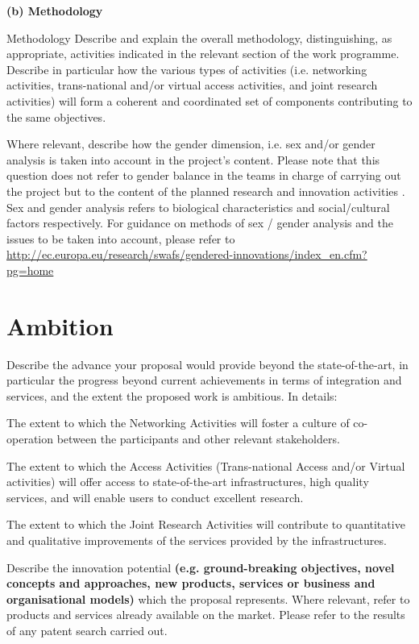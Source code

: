 

{\bf (b) Methodology}

\begin{todo}{Methodology}\color{red}
  Describe and explain the overall methodology, distinguishing, as appropriate, activities indicated in the relevant section of the work programme. Describe in particular how the various types of activities (i.e. networking activities, trans-national and/or virtual access activities, and joint research activities) will form a coherent and coordinated set of components contributing to the same objectives.

  Where relevant, describe how the gender dimension, i.e. sex and/or gender analysis is taken into account in the project’s content.
  Please note that this question does not refer to gender balance in the teams in charge of carrying out the project but to the content of the planned research and innovation activities . Sex and gender analysis refers to biological characteristics and social/cultural factors respectively. For guidance on methods of sex / gender analysis and the issues to be taken into account, please refer to \url{http://ec.europa.eu/research/swafs/gendered-innovations/index_en.cfm?pg=home} 
\end{todo}



\section{Ambition}

\begin{todo}{}\color{red}
  Describe the advance your proposal would provide beyond the state-of-the-art, in particular the progress beyond current achievements in terms of integration and services, and the extent the proposed work is ambitious. In details:

  The extent to which the Networking Activities will foster a culture of co-operation between the participants and other relevant stakeholders.

  The extent to which the Access Activities (Trans-national Access and/or Virtual activities) will offer access to state-of-the-art infrastructures, high quality services, and will enable users to conduct excellent research.

  The extent to which the Joint Research Activities will contribute to quantitative and qualitative improvements of the services provided by the infrastructures.

  Describe the innovation potential {\bf (e.g. ground-breaking objectives, novel concepts and approaches, new products, services or business and organisational models)} which the proposal represents. Where relevant, refer to products and services already available on the market. Please refer to the results of any patent search carried out.
\end{todo}









